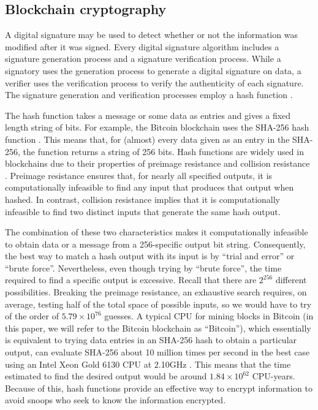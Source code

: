 \documentclass[nofootinbib,aps,prd,reprint,superscriptaddress,floatfix]{revtex4-2}
\begin{document}
\subsection{Blockchain cryptography}\label{subsec:cryptography}

A digital signature may be used to detect whether or not the information was modified after it was signed. Every digital signature algorithm includes a signature generation process and a signature verification process. While a signatory uses the generation process to generate a digital signature on data, a verifier uses the verification process to verify the authenticity of each signature. The signature generation and verification processes employ a hash function \cite{Asymmetric_cryptography}.

The hash function takes a message or some data as entries and gives a fixed length string of bits. For example, the Bitcoin blockchain uses the SHA-256 hash function \cite{Bitcoin_nakamoto}. This means that, for (almost) every data given as an entry in the SHA-256, the function returns a string of 256 bits. Hash functions are widely used in blockchains due to their properties of preimage resistance and collision resistance \cite{Hash}. Preimage resistance ensures that, for nearly all specified outputs, it is computationally infeasible to find any input that produces that output when hashed. In contrast, collision resistance implies that it is computationally infeasible to find two distinct inputs that generate the same hash output. 

The combination of these two characteristics makes it computationally infeasible to obtain data or a message from a 256-specific output bit string. Consequently, the best way to match a hash output with its input is by ``trial and error'' or ``brute force''.
Nevertheless, even though trying by ``brute force'', the time required to find a specific output is excessive. Recall that there are $2^{256}$ different possibilities. Breaking the preimage resistance, an exhaustive search requires, on average, testing half of the total space of possible inputs, so we would have to try of the order of $5.79 \times 10^{76}$ guesses. A typical CPU for mining blocks in Bitcoin (in this paper, we will refer to the Bitcoin blockchain as ``Bitcoin''), which essentially is equivalent to trying data entries in an SHA-256 hash to obtain a particular output, can evaluate SHA-256 about 10 million times per second in the best case using an Intel Xeon Gold 6130 CPU at 2.10GHz \cite{Hash_brute_force}. This means that the time estimated to find the desired output would be around $1.84 \times 10^{62}$ CPU-years. Because of this, hash functions provide an effective way to encrypt information to avoid snoops who seek to know the information encrypted. 
\end{document}
